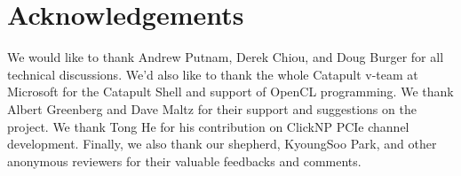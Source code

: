 
\section*{Acknowledgements}

We would like to thank Andrew Putnam, Derek Chiou, and Doug Burger for all technical discussions.
We'd also like to thank the whole Catapult v-team at Microsoft for the Catapult Shell and support of OpenCL programming.
We thank Albert Greenberg and Dave Maltz for their support and suggestions on the project.
We thank Tong He for his contribution on ClickNP PCIe channel development.
Finally, we also thank our shepherd, KyoungSoo Park, and other anonymous reviewers for their valuable feedbacks and comments.
